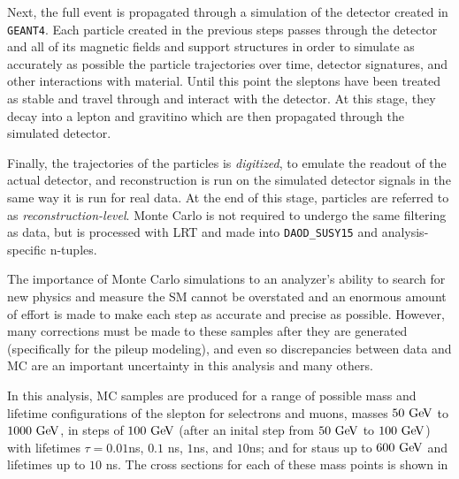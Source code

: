 
Next, the full event is propagated through a simulation of the detector created in \texttt{GEANT4}. Each particle created in the previous steps passes through the detector and all of its magnetic fields and support structures in order to simulate as accurately as possible the particle trajectories over time, detector signatures, and other interactions with material. Until this point the sleptons have been treated as stable and travel through and interact with the detector. At this stage, they decay into a lepton and gravitino which are then propagated through the simulated detector. 

Finally, the trajectories of the particles is \emph{digitized}, to emulate the readout of the actual detector, and reconstruction is run on the simulated detector signals in the same way it is run for real data. At the end of this stage, particles are referred to as \emph{reconstruction-level}. Monte Carlo is not required to undergo the same filtering as data, but is processed with \ac{LRT} and made into \texttt{DAOD\_SUSY15} and analysis-specific n-tuples.  

The importance of Monte Carlo simulations to an analyzer's ability to search for new physics and measure the \ac{SM} cannot be overstated and an enormous amount of effort is made to make each step as accurate and precise as possible. However, many corrections must be made to these samples after they are generated (specifically for the pileup modeling), and even so discrepancies between data and \ac{MC} are an important uncertainty in this analysis and many others.

In this analysis, \ac{MC} samples are produced for a range of possible mass and lifetime configurations of the slepton for selectrons and muons, masses $50 \GeV$ to $1000 \GeV$, in steps of $100 \GeV$ (after an inital step from $50 \GeV$ to $100 \GeV$) with lifetimes $\tau = 0.01$ns, $0.1$ ns, $1$ns, and $10$ns; and for staus up to $600 \GeV$ and lifetimes up to $10$ ns. The cross sections for each of these mass points is shown in 

